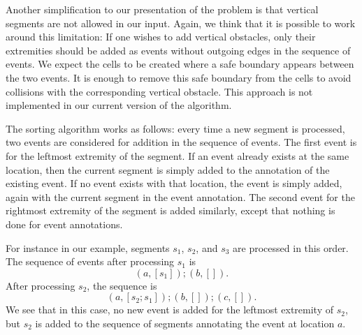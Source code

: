 \documentclass{llncs}
\begin{document}
Another simplification to our presentation of the problem is that
vertical segments are not allowed in our input.  Again, we think that
it is possible to work around this limitation: If one wishes to add
vertical obstacles, only their extremities should be added as events
without outgoing edges in the sequence of events.  We expect the
cells to be created where a safe boundary appears between the two
events.  It is enough to remove this safe boundary from the cells to
avoid collisions with the corresponding vertical obstacle.  This
approach is not implemented in our current version of the algorithm.

The sorting algorithm works as follows: every time a new segment is
processed, two events are considered for addition in the sequence of events.
The first event is for the leftmost extremity of the segment.  If an
event already exists at the same location, then the current segment is
simply added to the annotation of the existing event.  If no event exists
with that location, the event is simply added, again with the current segment
in the event annotation.  The second event for the rightmost extremity of the
segment is added similarly, except that nothing is done for event annotations.

For instance in our example, segments \(s_1\), \(s_2\), and \(s_3\) are
processed in this order.  The sequence of events after processing \(s_1\) is
\[ (a, [s_1]); (b, []).\]
After processing \(s_2\), the sequence is
\[ (a, [s_2; s_1]); (b, []); (c, []). \]
We see that in this case, no new event is added for the leftmost extremity
of \(s_2\), but \(s_2\) is added to the sequence of segments annotating the
event at location \(a\).
\end{document}
